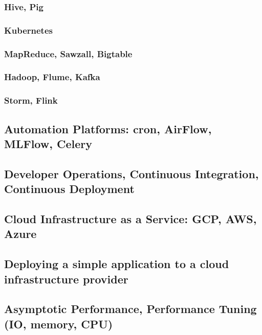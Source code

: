   \subsubsection{Hive, Pig}
  \subsubsection{Kubernetes}
  \subsubsection{MapReduce, Sawzall, Bigtable}
  \subsubsection{Hadoop, Flume, Kafka}
  \subsubsection{Storm, Flink}

\subsection{Automation Platforms: cron, AirFlow, MLFlow, Celery}

\subsection{Developer Operations, Continuous Integration, Continuous Deployment}

\subsection{Cloud Infrastructure as a Service: GCP, AWS, Azure}

\subsection{Deploying a simple application to a cloud infrastructure provider}

\subsection{Asymptotic Performance, Performance Tuning (IO, memory, CPU)}

